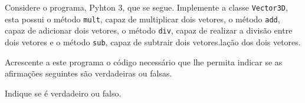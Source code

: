 \documentclass[12pt,varwidth=16cm,border=1pt]{standalone}
\begin{document}
Considere o programa, Pyhton 3, que se segue. Implemente a classe \verb+Vector3D+, esta possui o método \verb+mult+, capaz de multiplicar dois vetores, o método \verb+add+, capaz de adicionar dois vetores, o método \verb+div+, capaz de realizar a divisão entre dois vetores e o método \verb+sub+, capaz de subtrair dois vetores.lação
dos dois vetores.



Acrescente a este programa o código necessário que lhe permita indicar se as
afirmações seguintes são verdadeiras ou falsas.

Indique se é verdadeiro ou falso.
\end{document}
